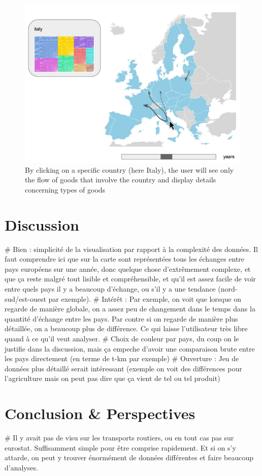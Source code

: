\documentclass{vgtc}
\begin{document}
\begin{figure}[H]
\includegraphics[scale=0.35]{Capture_ecran_2017-11-29_171255.jpg}
\caption{By clicking on a specific country (here Italy), the user will see only the flow of goods that involve the country and display details concerning types of goods}
\end{figure}


\section{Discussion}
# Bien : simplicité de la visualisation par rapport à la complexité des données. Il faut comprendre ici que sur la carte sont représentées tous les échanges entre pays européens sur une année, donc quelque chose d'extrêmement complexe, et que ça reste malgré tout lisible et compréhensible, et qu'il est assez facile de voir entre quels pays il y a beaucoup d'échange, ou s'il y a une tendance (nord-sud/est-ouest par exemple).
# Intérêt : Par exemple, on voit que lorsque on regarde de manière globale, on a assez peu de changement dans le temps dans la quantité d'échange entre les pays. Par contre si on regarde de manière plus détaillée, on a beaucoup plus de différence. Ce qui laisse l'utilisateur très libre quand à ce qu'il veut analyser.
# Choix de couleur par pays, du coup on le justifie dans la discussion, mais ça empeche d'avoir une comparaison brute entre les pays directement (en terme de t-km par exemple)
# Ouverture : Jeu de données plus détaillé serait intéressant (exemple on voit des différences pour l'agriculture mais on peut pas dire que ça vient de tel ou tel produit)

\section{Conclusion \& Perspectives}
# Il y avait pas de visu sur les transports routiers, ou en tout cas pas sur eurostat. Suffisamment simple pour être comprise rapidement. Et si on s'y attarde, on peut y trouver énormément de données différentes et faire beaucoup d'analyses.




\end{document}
